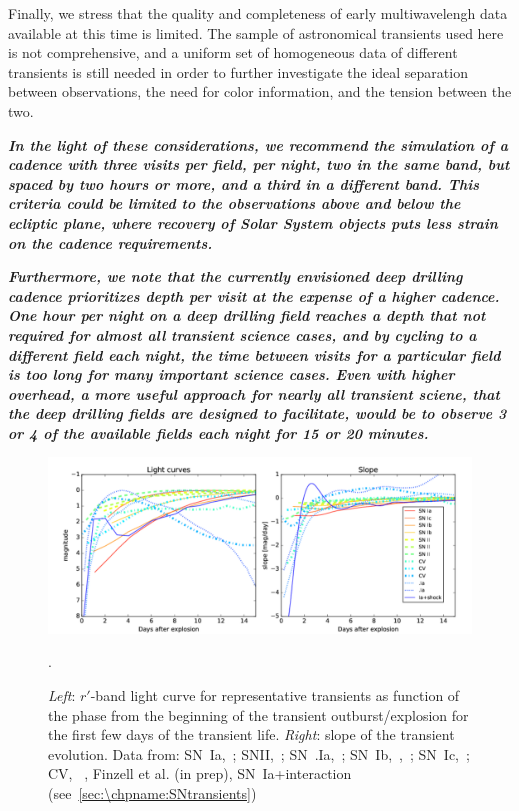 Finally, we stress that the quality and completeness of early
multiwavelengh data available at this time is limited. The sample of
astronomical transients used here is not comprehensive, and a uniform
set of homogeneous data of different transients is still needed in
order to further investigate the ideal separation between
observations, the need for color information, and the tension between
the two.

{\bf\emph{In the light of these considerations, we recommend the
    simulation of a cadence with three visits per field, per night,
    two in the same band, but spaced by two hours or more, and a third
    in a different band. This criteria could be limited to the
    observations above and below the ecliptic plane, where recovery of
    Solar System objects puts less strain on the cadence
    requirements. }}

{\bf\emph{Furthermore, we note that the currently envisioned
    deep drilling cadence prioritizes depth per visit at the expense
    of a higher cadence. One hour per night on a deep drilling field
    reaches a depth that not required for almost all transient science
    cases, and by cycling to a different field each night, the time
    between visits for a particular field is too long for many
    important science cases. Even with higher overhead, a more useful
    approach for nearly all transient sciene, that the deep drilling
    fields are designed to facilitate, would be to observe 3 or 4 of
    the available fields each night for 15 or 20 minutes.}}

\begin{figure}[hbt]
\centerline{
\includegraphics[width=\textwidth]{figs/transients/earlyslope1.pdf}
}
\caption{\emph{Left}: $r'$-band light curve for representative transients as function of the phase from the beginning of the transient outburst/explosion for the first few days of the transient life. \emph{Right}: slope of the transient evolution. Data from: SN~Ia,~\citet{Olling15}; SNII,~\citet{Rubin16}; SN~.Ia,~\citet{Shen10}; SN~Ib,~\citet{Valenti11},~\citet{Cao13}; SN~Ic,~\citet{Mazzali02}; CV, ~\citet{Sokoloski13}, Finzell et al. (in prep), SN~Ia+interaction (see~\autoref{sec:\chpname:SNtransients})}.
\label{fig:earlyslope}
\end{figure}

